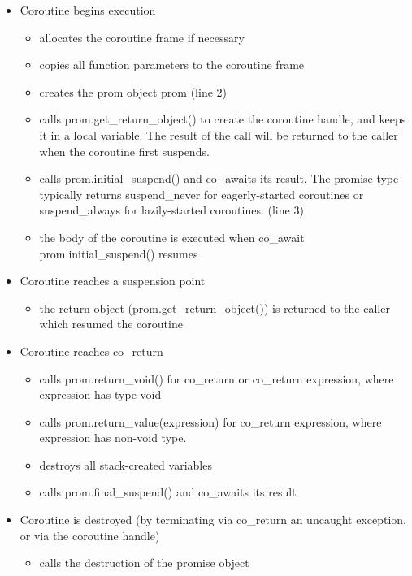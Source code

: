 \begin{itemize}
\item 
Coroutine begins execution
\begin{itemize}
\item 
allocates the coroutine frame if necessary

\item 
copies all function parameters to the coroutine frame

\item 
creates the prom object prom (line 2)

\item 
calls prom.get\_return\_object() to create the coroutine handle, and keeps it in a local variable. The result of the call will be returned to the caller when the coroutine first suspends.

\item 
calls prom.initial\_suspend() and co\_awaits its result. The promise type typically returns suspend\_never for eagerly-started coroutines or suspend\_always for lazily-started coroutines. (line 3)

\item 
the body of the coroutine is executed when co\_await prom.initial\_suspend() resumes
\end{itemize}

\item 
Coroutine reaches a suspension point
\begin{itemize}
\item 
the return object (prom.get\_return\_object()) is returned to the caller which resumed the coroutine
\end{itemize}

\item 
Coroutine reaches co\_return
\begin{itemize}
\item 
calls prom.return\_void() for co\_return or co\_return expression, where expression has type void

\item 
calls prom.return\_value(expression) for co\_return expression, where expression has non-void type.

\item 
destroys all stack-created variables

\item 
calls prom.final\_suspend() and co\_awaits its result
\end{itemize}

\item 
Coroutine is destroyed (by terminating via co\_return an uncaught exception, or via the coroutine handle)
\begin{itemize}
\item 
calls the destruction of the promise object


\end{itemize}
\end{itemize}
